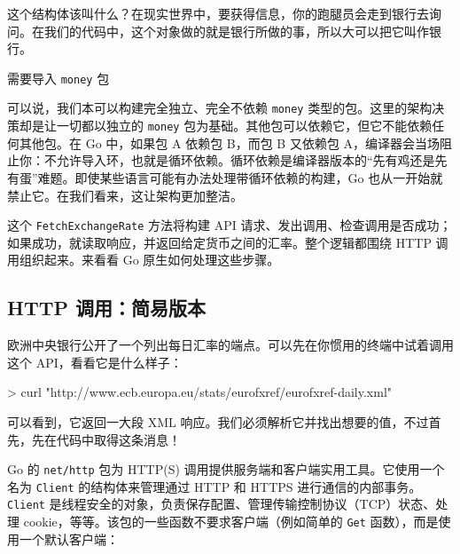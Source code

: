 这个结构体该叫什么？在现实世界中，要获得信息，你的跑腿员会走到银行去询问。在我们的代码中，这个对象做的就是银行所做的事，所以大可以把它叫作银行。


\begin{codeannotations}
\item 需要导入 \texttt{money} 包
\end{codeannotations}

可以说，我们本可以构建完全独立、完全不依赖 \texttt{money} 类型的包。这里的架构决策却是让一切都以独立的 \texttt{money} 包为基础。其他包可以依赖它，但它不能依赖任何其他包。在 Go 中，如果包 A 依赖包 B，而包 B 又依赖包 A，编译器会当场阻止你：不允许导入环，也就是循环依赖。循环依赖是编译器版本的“先有鸡还是先有蛋”难题。即使某些语言可能有办法处理带循环依赖的构建，Go 也从一开始就禁止它。在我们看来，这让架构更加整洁。

这个 \texttt{FetchExchangeRate} 方法将构建 API 请求、发出调用、检查调用是否成功；如果成功，就读取响应，并返回给定货币之间的汇率。整个逻辑都围绕 HTTP 调用组织起来。来看看 Go 原生如何处理这些步骤。

\subsection{HTTP 调用：简易版本}

欧洲中央银行公开了一个列出每日汇率的端点。可以先在你惯用的终端中试着调用这个 API，看看它是什么样子：

\begin{shellcode}[]
> curl "http://www.ecb.europa.eu/stats/eurofxref/eurofxref-daily.xml"
\end{shellcode}

可以看到，它返回一大段 XML 响应。我们必须解析它并找出想要的值，不过首先，先在代码中取得这条消息！

Go 的 \texttt{net/http} 包为 HTTP(S) 调用提供服务端和客户端实用工具。它使用一个名为 \texttt{Client} 的结构体来管理通过 HTTP 和 HTTPS 进行通信的内部事务。\texttt{Client} 是线程安全的对象，负责保存配置、管理传输控制协议（TCP）状态、处理 cookie，等等。该包的一些函数不要求客户端（例如简单的 \texttt{Get} 函数），而是使用一个默认客户端：

